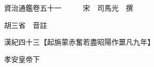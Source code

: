 










 


 
 


 

  
  
  
  
  





  
  
  
  
  
 
  

  

  
  
  



  

 
 

  
   




  

  
  


  　　資治通鑑卷五十一　　　宋　司馬光　撰

　　胡三省　音註

　　漢紀四十三【起旃蒙赤奮若盡昭陽作噩凡九年】

　　孝安皇帝下


